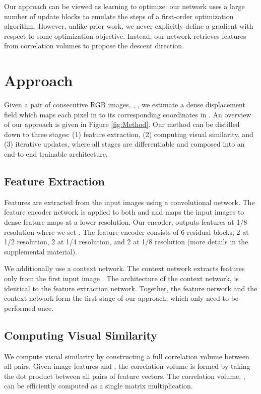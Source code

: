\documentclass[runningheads]{llncs}
\begin{document}
Our approach can be viewed as learning to optimize: our network uses a large number of update blocks to emulate the steps of a first-order optimization algorithm. However, unlike prior work, we never explicitly define a gradient with respect to some optimization objective. Instead, our network retrieves features from correlation volumes to propose the descent direction.

\section{Approach}

Given a pair of consecutive RGB images, , , we estimate a dense displacement field  which maps each pixel  in  to its corresponding coordinates  in . An overview of our approach is given in Figure \ref{fig:Method}. Our method can be distilled down to three stages: (1) feature extraction, (2) computing visual similarity, and (3) iterative updates, where all stages are differentiable and composed into an end-to-end trainable architecture. 

\subsection{Feature Extraction}
\label{sec:feature_extraction}
Features are extracted from the input images using a convolutional network. The feature encoder network is applied to both  and  and maps the input images to dense feature maps at a lower resolution. Our encoder,  outputs features at 1/8 resolution  where we set . The feature encoder consists of 6 residual blocks, 2 at 1/2 resolution, 2 at 1/4 resolution, and 2 at 1/8 resolution (more details in the supplemental material).

We additionally use a context network. The context network extracts features only from the first input image . The architecture of the context network,  is identical to the feature extraction network. Together, the feature network  and the context network  form the first stage of our approach, which only need to be performed once.

\subsection{Computing Visual Similarity}
\label{sec:similarity}

We compute visual similarity by constructing a full correlation volume between all pairs. Given image features  and , the correlation volume is formed by taking the dot product between all pairs of feature vectors. The correlation volume, , can be efficiently computed as a single matrix multiplication.
\end{document}

